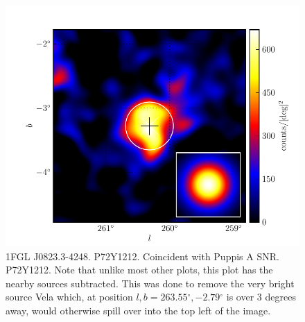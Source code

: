 \documentclass[preprint]{aastex}
\renewcommand{\deg}{\ensuremath{^\circ}\xspace}
\begin{document}
\begin{figure}
  \begin{center}
    \includegraphics[type=pdf,ext=.pdf,read=.pdf]{source_plots/source_1FGL_J0823.3-4248}
  \end{center}
  \caption{1FGL J0823.3-4248. P72Y1212. Coincident with Puppis A SNR.
  P72Y1212.
  Note that unlike most other plots, this plot has the nearby sources subtracted.
  This was done to remove the very bright source Vela which,
  at position $l,b=263.55\deg,-2.79\deg$ is over 3 degrees away,
  would otherwise spill over into the top left of the image.
  }\label{1FGL_J0823.3-4248}
\end{figure}
\end{document}
